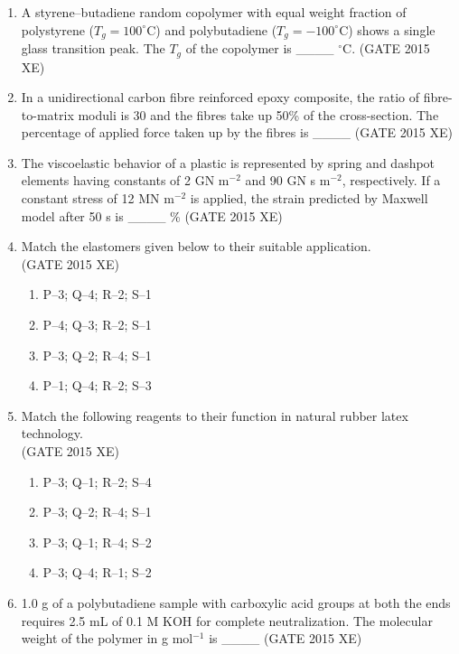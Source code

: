 \documentclass[journal,12pt,onecolumn]{IEEEtran}
\begin{document}
\begin{enumerate}
\item A styrene–butadiene random copolymer with equal weight fraction of polystyrene ($T_g=100^\circ$C) and polybutadiene ($T_g=-100^\circ$C) shows a single glass transition peak. The $T_g$ of the copolymer is \_\_\_\_ $^\circ$C.
\hfill{(GATE 2015 XE)} \\

\item In a unidirectional carbon fibre reinforced epoxy composite, the ratio of fibre-to-matrix moduli is 30 and the fibres take up 50\% of the cross-section. The percentage of applied force taken up by the fibres is \_\_\_\_
\hfill{(GATE 2015 XE)} \\

\item The viscoelastic behavior of a plastic is represented by spring and dashpot elements having constants of 2 GN m$^{-2}$ and 90 GN s m$^{-2}$, respectively. If a constant stress of 12 MN m$^{-2}$ is applied, the strain predicted by Maxwell model after 50 s is \_\_\_\_ \%
\hfill{(GATE 2015 XE)} \\

\newpage

\item Match the elastomers given below to their suitable application.\\


\hfill{(GATE 2015 XE)}
\begin{multicols}{2}
\begin{enumerate}
\item P–3; Q–4; R–2; S–1
\item P–4; Q–3; R–2; S–1
\item P–3; Q–2; R–4; S–1
\item P–1; Q–4; R–2; S–3
\end{enumerate}
\end{multicols}


\item Match the following reagents to their function in natural rubber latex technology.\\


\hfill{(GATE 2015 XE)} 
\begin{multicols}{2}
\begin{enumerate}
\item P–3; Q–1; R–2; S–4
\item P–3; Q–2; R–4; S–1
\item P–3; Q–1; R–4; S–2
\item P–3; Q–4; R–1; S–2
\end{enumerate}
\end{multicols}


\item 1.0 g of a polybutadiene sample with carboxylic acid groups at both the ends requires 2.5 mL of 0.1 M KOH for complete neutralization. The molecular weight of the polymer in g mol$^{-1}$ is \_\_\_\_
\hfill{(GATE 2015 XE)} \\


\end{enumerate}
\end{document}
